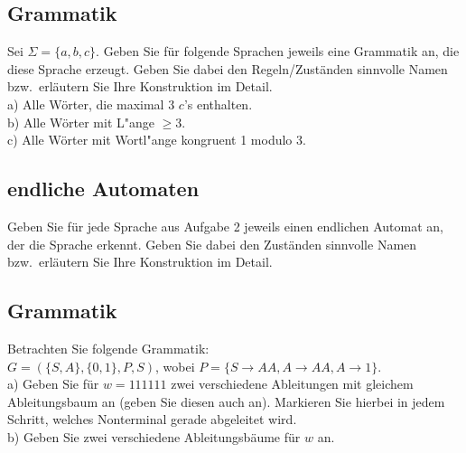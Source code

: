 \documentclass[paper=a4, fontsize=11pt]{scrartcl}
\numberwithin{equation}{section}
\numberwithin{figure}{section}
\numberwithin{table}{section}
\begin{document}
\subsection{Grammatik}

Sei $\Sigma=\{a,b,c\}$. 
Geben Sie für folgende Sprachen jeweils eine Grammatik an, die diese Sprache erzeugt. 
Geben Sie dabei den Regeln/Zuständen sinnvolle Namen bzw.\ erläutern Sie Ihre Konstruktion im Detail. \\

a) Alle Wörter, die maximal 3 $c$'s enthalten. \\

b) Alle Wörter mit L"ange $\geq 3$. \\

c) Alle Wörter mit  Wortl"ange kongruent 1 modulo 3. \\
 

\subsection{endliche Automaten}

Geben Sie für jede Sprache aus Aufgabe 2 jeweils einen endlichen Automat an, der die Sprache erkennt.
Geben Sie dabei den Zuständen sinnvolle Namen bzw.\ erläutern Sie Ihre Konstruktion im Detail.


\subsection{Grammatik}

Betrachten Sie folgende Grammatik: \\

$G=(\{S,A\},\{0,1\},P,S)$, wobei $P= \{S\rightarrow AA, A \rightarrow AA, A \rightarrow 1\}$. \\

a)  Geben Sie für $w=111111$ zwei verschiedene Ableitungen mit gleichem Ableitungsbaum an (geben Sie diesen auch an). Markieren Sie hierbei in jedem Schritt, welches Nonterminal gerade abgeleitet wird. \\

b) Geben Sie zwei verschiedene Ableitungsbäume für $w$ an. \\

\end{document}
